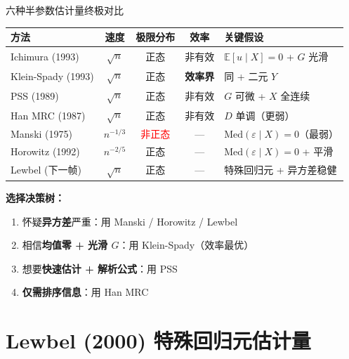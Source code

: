 \documentclass[aspectratio=169, 10pt]{beamer}
\begin{document}
\begin{frame}{六种半参数估计量终极对比}

  \begin{center}\scriptsize
  \begin{tabular}{p{2.3cm}|c|c|c|p{4cm}}
  \hline
  方法 & 速度 & 极限分布 & 效率 & 关键假设 \\
  \hline
  Ichimura (1993) & $\sqrt{n}$ & 正态 & 非有效 & $\mathbb{E}[u\mid X] = 0$ + $G$ 光滑 \\
  \hline
  Klein-Spady (1993) & $\sqrt{n}$ & 正态 & \textbf{效率界} & 同 + 二元 $Y$ \\
  \hline
  PSS (1989) & $\sqrt{n}$ & 正态 & 非有效 & $G$ 可微 + $X$ 全连续 \\
  \hline
  Han MRC (1987) & $\sqrt{n}$ & 正态 & 非有效 & $D$ 单调（更弱）\\
  \hline
  Manski (1975) & $n^{-1/3}$ & \textcolor{red}{非正态} & --- & $\text{Med}(\varepsilon\mid X) = 0$（最弱）\\
  \hline
  Horowitz (1992) & $n^{-2/5}$ & 正态 & --- & $\text{Med}(\varepsilon\mid X) = 0$ + 平滑 \\
  \hline
  Lewbel (下一帧) & $\sqrt{n}$ & 正态 & --- & 特殊回归元 + 异方差稳健 \\
  \hline
  \end{tabular}
  \end{center}

  \begin{highlightbox}
    \textbf{选择决策树：}
    \begin{enumerate}\setlength{\itemsep}{1pt}
      \item 怀疑\textbf{异方差}严重：用 Manski / Horowitz / Lewbel
      \item 相信\textbf{均值零 + 光滑 $G$}：用 Klein-Spady（效率最优）
      \item 想要\textbf{快速估计 + 解析公式}：用 PSS
      \item \textbf{仅需排序信息}：用 Han MRC
    \end{enumerate}
  \end{highlightbox}

\end{frame}

\section{Lewbel (2000) 特殊回归元估计量}
\end{document}
